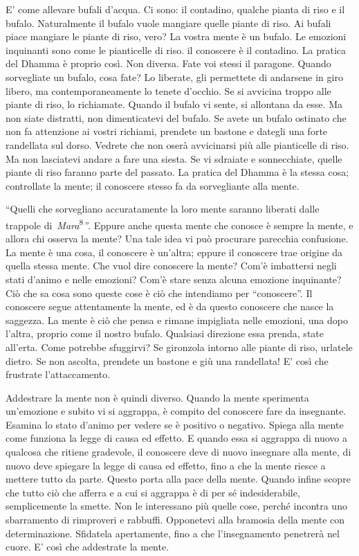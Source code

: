 E' come allevare bufali d'acqua. Ci sono: il contadino, qualche pianta
di riso e il bufalo. Naturalmente il bufalo vuole mangiare quelle piante
di riso. Ai bufali piace mangiare le piante di riso, vero? La vostra
mente è un bufalo. Le emozioni inquinanti sono come le pianticelle di
riso. il conoscere è il contadino. La pratica del Dhamma è proprio così.
Non diversa. Fate voi stessi il paragone. Quando sorvegliate un bufalo,
cosa fate? Lo liberate, gli permettete di andarsene in giro libero, ma
contemporaneamente lo tenete d'occhio. Se si avvicina troppo alle piante
di riso, lo richiamate. Quando il bufalo vi sente, si allontana da esse.
Ma non siate distratti, non dimenticatevi del bufalo. Se avete un bufalo
ostinato che non fa attenzione ai vostri richiami, prendete un bastone e
dategli una forte randellata sul dorso. Vedrete che non oserà
avvicinarsi più alle pianticelle di riso. Ma non lasciatevi andare a
fare una siesta. Se vi sdraiate e sonnecchiate, quelle piante di riso
faranno parte del passato. La pratica del Dhamma è la stessa cosa;
controllate la mente; il conoscere stesso fa da sorvegliante alla mente.

``Quelli che sorvegliano accuratamente la loro mente saranno liberati
dalle trappole di~\emph{Mara}\textsuperscript{8}\emph{''}. Eppure anche
questa mente che conosce è sempre la mente, e allora chi osserva la
mente? Una tale idea vi può procurare parecchia confusione. La mente è
una cosa, il conoscere è un'altra; eppure il conoscere trae origine da
quella stessa mente. Che vuol dire conoscere la mente? Com'è imbattersi
negli stati d'animo e nelle emozioni? Com'è stare senza alcuna emozione
inquinante? Ciò che sa cosa sono queste cose è ciò che intendiamo per
``conoscere''. Il conoscere segue attentamente la mente, ed è da questo
conoscere che nasce la saggezza. La mente è ciò che pensa e rimane
impigliata nelle emozioni, una dopo l'altra, proprio come il nostro
bufalo. Qualsiasi direzione essa prenda, state all'erta. Come potrebbe
sfuggirvi? Se gironzola intorno alle piante di riso, urlatele dietro. Se
non ascolta, prendete un bastone e giù una randellata! E' così che
frustrate l'attaccamento.

Addestrare la mente non è quindi diverso. Quando la mente sperimenta
un'emozione e subito vi si aggrappa, è compito del conoscere fare da
insegnante. Esamina lo stato d'animo per vedere se è positivo o
negativo. Spiega alla mente come funziona la legge di causa ed effetto.
E quando essa si aggrappa di nuovo a qualcosa che ritiene gradevole, il
conoscere deve di nuovo insegnare alla mente, di nuovo deve spiegare la
legge di causa ed effetto, fino a che la mente riesce a mettere tutto da
parte. Questo porta alla pace della mente. Quando infine scopre che
tutto ciò che afferra e a cui si aggrappa è di per sé indesiderabile,
semplicemente la smette. Non le interessano più quelle cose, perché
incontra uno sbarramento di rimproveri e rabbuffi. Opponetevi alla
bramosia della mente con determinazione. Sfidatela apertamente, fino a
che l'insegnamento penetrerà nel cuore. E' così che addestrate la mente.

